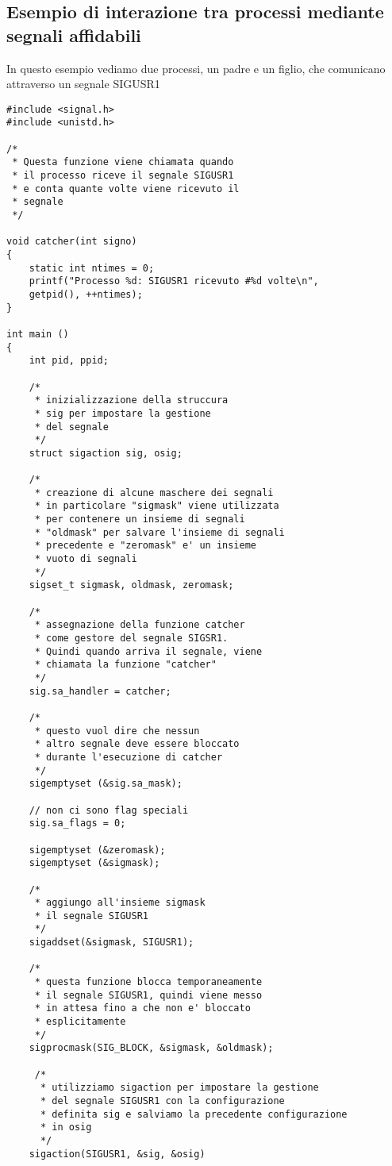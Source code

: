 \documentclass[italian,12pt,a4paper]{article}
\begin{document}
\subsection{Esempio di interazione tra processi mediante segnali affidabili}
In questo esempio vediamo due processi, un padre e un figlio, che comunicano attraverso un segnale SIGUSR1
\begin{lstlisting}[xleftmargin=-2cm]
#include <signal.h>
#include <unistd.h>

/* 
 * Questa funzione viene chiamata quando
 * il processo riceve il segnale SIGUSR1
 * e conta quante volte viene ricevuto il
 * segnale
 */
 
void catcher(int signo)
{
	static int ntimes = 0;
	printf("Processo %d: SIGUSR1 ricevuto #%d volte\n",
	getpid(), ++ntimes);
}

int main ()
{
	int pid, ppid;
	
	/* 
	 * inizializzazione della struccura
	 * sig per impostare la gestione
	 * del segnale
	 */
	struct sigaction sig, osig;
	
	/* 
	 * creazione di alcune maschere dei segnali
	 * in particolare "sigmask" viene utilizzata
	 * per contenere un insieme di segnali
	 * "oldmask" per salvare l'insieme di segnali
	 * precedente e "zeromask" e' un insieme
	 * vuoto di segnali
	 */
	sigset_t sigmask, oldmask, zeromask;
	
	/* 
	 * assegnazione della funzione catcher 
	 * come gestore del segnale SIGSR1.
	 * Quindi quando arriva il segnale, viene 
	 * chiamata la funzione "catcher"
	 */
	sig.sa_handler = catcher;
	
	/*
	 * questo vuol dire che nessun
	 * altro segnale deve essere bloccato
	 * durante l'esecuzione di catcher
	 */
	sigemptyset (&sig.sa_mask);
	
	// non ci sono flag speciali
	sig.sa_flags = 0;
	
	sigemptyset (&zeromask);
	sigemptyset (&sigmask);
	
	/*
	 * aggiungo all'insieme sigmask
	 * il segnale SIGUSR1
	 */
	sigaddset(&sigmask, SIGUSR1);
	
	/* 
	 * questa funzione blocca temporaneamente 
	 * il segnale SIGUSR1, quindi viene messo 
	 * in attesa fino a che non e' bloccato
	 * esplicitamente
	 */
	sigprocmask(SIG_BLOCK, &sigmask, &oldmask);
	
	 /*
	  * utilizziamo sigaction per impostare la gestione
	  * del segnale SIGUSR1 con la configurazione
	  * definita sig e salviamo la precedente configurazione
	  * in osig
	  */
	sigaction(SIGUSR1, &sig, &osig)
	

\end{lstlisting}
\end{document}
